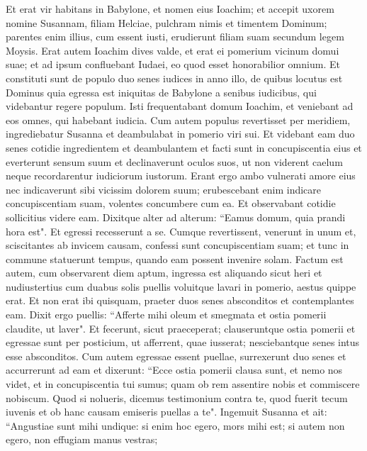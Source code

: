 \begin{biblechapter}  
\verse Et erat vir habitans in Babylone, et nomen eius Ioachim; 
\verse et accepit uxorem nomine Susannam, filiam Helciae, pulchram nimis et timentem Dominum;  
\verse parentes enim illius, cum essent iusti, erudierunt filiam suam secundum legem Moysis. 
\verse Erat autem Ioachim dives valde, et erat ei pomerium vicinum domui suae; et ad ipsum confluebant Iudaei, eo quod esset honorabilior omnium. 
\verse Et constituti sunt de populo duo senes iudices in anno illo, de quibus locutus est Dominus quia egressa est iniquitas de Babylone a senibus iudicibus, qui videbantur regere populum. 
\verse Isti frequentabant domum Ioachim, et veniebant ad eos omnes, qui habebant iudicia. 
\verse Cum autem populus revertisset per meridiem, ingrediebatur Susanna et deambulabat in pomerio viri sui. 
\verse Et videbant eam duo senes cotidie ingredientem et deambulantem et facti sunt in concupiscentia eius 
\verse et everterunt sensum suum et declinaverunt oculos suos, ut non viderent caelum neque recordarentur iudiciorum iustorum. 
\verse Erant ergo ambo vulnerati amore eius nec indicaverunt sibi vicissim dolorem suum; 
\verse erubescebant enim indicare concupiscentiam suam, volentes concumbere cum ea. 
\verse Et observabant cotidie sollicitius videre eam. Dixitque alter ad alterum: 
\verse “Eamus domum, quia prandi hora est". Et egressi recesserunt a se. 
\verse Cumque revertissent, venerunt in unum et, sciscitantes ab invicem causam, confessi sunt concupiscentiam suam; et tunc in commune statuerunt tempus, quando eam possent invenire solam. 
\verse Factum est autem, cum observarent diem aptum, ingressa est aliquando sicut heri et nudiustertius cum duabus solis puellis voluitque lavari in pomerio, aestus quippe erat. 
\verse Et non erat ibi quisquam, praeter duos senes absconditos et contemplantes eam. 
\verse Dixit ergo puellis: “Afferte mihi oleum et smegmata et ostia pomerii claudite, ut laver". 
\verse Et fecerunt, sicut praeceperat; clauseruntque ostia pomerii et egressae sunt per posticium, ut afferrent, quae iusserat; nesciebantque senes intus esse absconditos. 
\verse Cum autem egressae essent puellae, surrexerunt duo senes et accurrerunt ad eam et dixerunt: 
\verse “Ecce ostia pomerii clausa sunt, et nemo nos videt, et in concupiscentia tui sumus; quam ob rem assentire nobis et commiscere nobiscum.  
\verse Quod si nolueris, dicemus testimonium contra te, quod fuerit tecum iuvenis et ob hanc causam emiseris puellas a te". 
\verse Ingemuit Susanna et ait: “Angustiae sunt mihi undique: si enim hoc egero, mors mihi est; si autem non egero, non effugiam manus vestras; 

\end{biblechapter}
